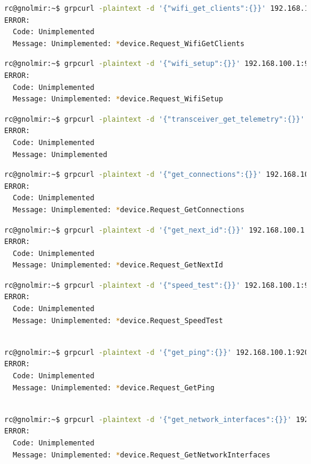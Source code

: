 \documentclass[IN,11pt,twoside,openright,bachelor,english]{tumthesis}
\begin{document}
\begin{lstlisting}[language=bash,basicstyle=\tiny]
rc@gnolmir:~$ grpcurl -plaintext -d '{"wifi_get_clients":{}}' 192.168.100.1:9200 SpaceX.API.Device.Device/Handle
ERROR:
  Code: Unimplemented
  Message: Unimplemented: *device.Request_WifiGetClients
\end{lstlisting}

\begin{lstlisting}[language=bash,basicstyle=\tiny]
rc@gnolmir:~$ grpcurl -plaintext -d '{"wifi_setup":{}}' 192.168.100.1:9200 SpaceX.API.Device.Device/Handle
ERROR:
  Code: Unimplemented
  Message: Unimplemented: *device.Request_WifiSetup
\end{lstlisting}

\begin{lstlisting}[language=bash,basicstyle=\tiny]
rc@gnolmir:~$ grpcurl -plaintext -d '{"transceiver_get_telemetry":{}}' 192.168.100.1:9200 SpaceX.API.Device.Device/Handle
ERROR:
  Code: Unimplemented
  Message: Unimplemented
\end{lstlisting}

\begin{lstlisting}[language=bash,basicstyle=\tiny]
rc@gnolmir:~$ grpcurl -plaintext -d '{"get_connections":{}}' 192.168.100.1:9200 SpaceX.API.Device.Device/Handle
ERROR:
  Code: Unimplemented
  Message: Unimplemented: *device.Request_GetConnections
\end{lstlisting}

\begin{lstlisting}[language=bash,basicstyle=\tiny]
rc@gnolmir:~$ grpcurl -plaintext -d '{"get_next_id":{}}' 192.168.100.1:9200 SpaceX.API.Device.Device/Handle
ERROR:
  Code: Unimplemented
  Message: Unimplemented: *device.Request_GetNextId
\end{lstlisting}

\begin{lstlisting}[language=bash,basicstyle=\tiny]
rc@gnolmir:~$ grpcurl -plaintext -d '{"speed_test":{}}' 192.168.100.1:9200 SpaceX.API.Device.Device/Handle
ERROR:
  Code: Unimplemented
  Message: Unimplemented: *device.Request_SpeedTest
\end{lstlisting}
\begin{lstlisting}[language=bash,basicstyle=\tiny]
  
rc@gnolmir:~$ grpcurl -plaintext -d '{"get_ping":{}}' 192.168.100.1:9200 SpaceX.API.Device.Device/Handle
ERROR:
  Code: Unimplemented
  Message: Unimplemented: *device.Request_GetPing
\end{lstlisting}
\begin{lstlisting}[language=bash,basicstyle=\tiny]

rc@gnolmir:~$ grpcurl -plaintext -d '{"get_network_interfaces":{}}' 192.168.100.1:9200 SpaceX.API.Device.Device/Handle
ERROR:
  Code: Unimplemented
  Message: Unimplemented: *device.Request_GetNetworkInterfaces
\end{lstlisting}
\end{document}
